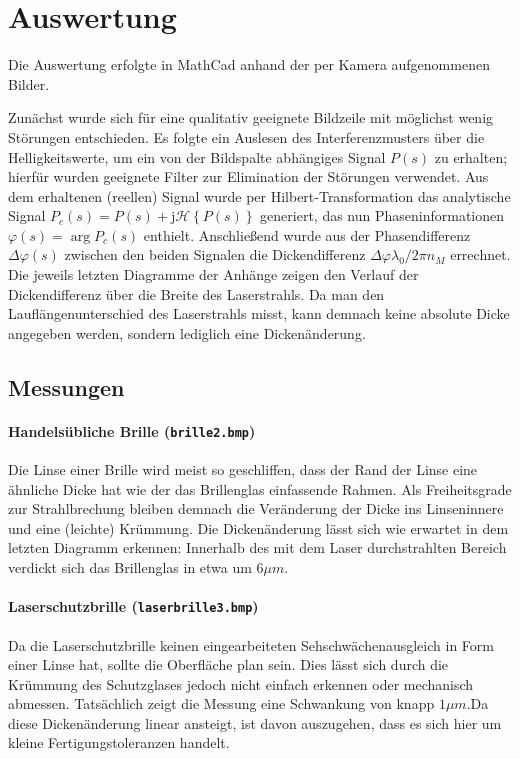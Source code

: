 \section{Auswertung}

Die Auswertung erfolgte in MathCad anhand der per Kamera aufgenommenen Bilder.

Zunächst wurde sich für eine qualitativ geeignete Bildzeile mit möglichst wenig Störungen entschieden. Es folgte ein Auslesen des Interferenzmusters über die Helligkeitswerte, um ein von der Bildspalte abhängiges Signal $P(s)$ zu erhalten; hierfür wurden geeignete Filter zur Elimination der Störungen verwendet. Aus dem erhaltenen (reellen) Signal wurde per Hilbert-Transformation das analytische Signal $P_c(s) = P(s) + \mathrm j \mathcal H\left\lbrace P(s) \right\rbrace$ generiert, das nun Phaseninformationen $\varphi(s)=\arg P_c(s)$ enthielt. Anschließend wurde aus der Phasendifferenz $\Delta\varphi(s)$  zwischen den beiden Signalen die Dickendifferenz $\Delta\varphi\lambda_0 / 2\pi n_M$ errechnet. Die jeweils letzten Diagramme der Anhänge zeigen den Verlauf der Dickendifferenz über die Breite des Laserstrahls. Da man den Lauflängenunterschied des Laserstrahls misst, kann demnach keine absolute Dicke angegeben werden, sondern lediglich eine Dickenänderung.

\subsection{Messungen}

\paragraph{Handelsübliche Brille (\texttt{brille2.bmp})}

Die Linse einer Brille wird meist so geschliffen, dass der Rand der Linse eine ähnliche Dicke hat wie der das Brillenglas einfassende Rahmen. Als Freiheitsgrade zur Strahlbrechung bleiben demnach die Veränderung der Dicke ins Linseninnere und eine (leichte) Krümmung.
Die Dickenänderung lässt sich wie erwartet in dem letzten Diagramm erkennen: Innerhalb des mit dem Laser durchstrahlten Bereich verdickt sich das Brillenglas in etwa um $6\mu m$.
 
\paragraph{Laserschutzbrille (\texttt{laserbrille3.bmp})}
Da die Laserschutzbrille keinen eingearbeiteten Sehschwächenausgleich in Form einer Linse hat, sollte die Oberfläche plan sein. Dies lässt sich durch die Krümmung des Schutzglases jedoch nicht einfach erkennen oder mechanisch abmessen. 
Tatsächlich zeigt die Messung eine Schwankung von knapp $1\mu m$.Da diese Dickenänderung linear ansteigt, ist davon auszugehen, dass es sich hier um kleine Fertigungstoleranzen handelt.

